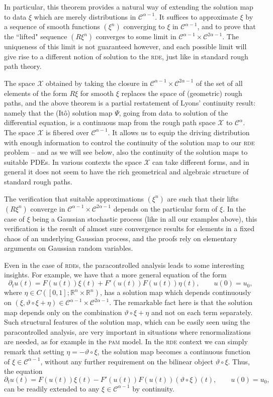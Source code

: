 \documentclass[a4paper,11pt]{article}
\theoremstyle{remark}
\newcommand{\CC}{\ensuremath{\mathscr{C}}}
\newcommand{\reso}{\,\mathord{\circ}\,}
\begin{document}
In particular, this theorem provides a natural way of extending the solution map to data $\xi$ which are merely distributions in $\CC^{\alpha-1}$. It suffices to approximate $\xi$ by a sequence of smooth functions $(\xi^n)$ converging to $\xi$ in $\CC^{\alpha-1}$, and to prove that the ``lifted" sequence $(R\xi^n)$ converges to some limit in $ \CC^{\alpha-1}\times\CC^{2\alpha-1}$. The uniqueness of this limit is not guaranteed however, and each possible limit will give rise to a different notion of solution to the \textsc{rde}, just like in standard rough path theory. 

The space $\mathcal{X}$ obtained by taking the closure in  $\CC^{\alpha-1}\times\CC^{2\alpha-1}$ of the set of all elements of the form $R\xi$ for smooth $\xi$ replaces the space of (geometric) rough paths, and the above theorem is a partial restatement of Lyons' continuity result: namely that the (It\^o) solution map $\Psi$, going from data to solution of the differential equation, is a continuous map from the rough path space $\mathcal{X}$ to $\CC^\alpha$. The space $\mathcal{X}$ is fibered over $\CC^{\alpha-1}$. It allows us to equip the driving distribution with enough information to control the continuity of the solution map to our \textsc{rde} problem -- and as we will see below, also the continuity of the solution maps to suitable PDEs. In various contexts the space $\mathcal{X}$ can take different forms, and in general it does not seem to have the rich geometrical and algebraic structure of standard rough paths. 

The verification that suitable approximations $(\xi^n)$ are such that their lifts $(R\xi^n)$  converge in $ \CC^{\alpha-1}\times\CC^{2\alpha-1}$ depends on the particular form of $\xi$. In the case of $\xi$ being a Gaussian stochastic process (like in all our examples above), this verification is the result of almost sure convergence results for elements in a fixed chaos of an underlying Gaussian process, and the proofs rely on elementary arguments on Gaussian random variables.   

Even in the case of \textsc{rde}s, the paracontrolled analysis leads to some interesting insights. For example, we have that a more general equation of the form
$$
\partial_t u(t) = F(u(t)) \xi(t) + F'(u(t))F(u(t))\eta(t) ,\qquad
u(0)=u_0,
$$
where $\eta \in C([0,1];\mathbb{R}^n \times \mathbb{R}^n)$,
has a solution map which depends continuously on $(\xi, \vartheta\reso \xi +\eta)\in\CC^{\alpha-1}\times \CC^{2\alpha-1}$. The remarkable fact here is that the solution map depends only on the combination $\vartheta\reso \xi +\eta$ and not on each term separately. Such structural features of the solution map, which can be easily seen using the paracontrolled analysis, are very important in situations where renormalizations are needed, as for example in the \textsc{pam} model. In the \textsc{rde} context we can simply remark that setting $\eta = -\vartheta\reso \xi$, the solution map becomes a continuous function of $\xi \in \CC^{\alpha-1}$, without any further requirement on the bilinear object $\vartheta\reso \xi$. Thus, the equation
$$
\partial_t u(t) = F(u(t)) \xi(t) - F'(u(t))F(u(t))(\vartheta\reso \xi)(t) ,\qquad
u(0)=u_0,
$$
can be readily extended to any $\xi\in\CC^{\alpha-1}$ by continuity. 
\end{document}
